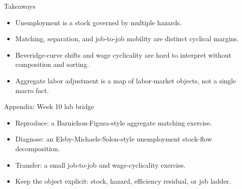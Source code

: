 \documentclass[aspectratio=169,11pt]{beamer}
\begin{document}
\begin{frame}{Takeaways}
\begin{itemize}
    \item Unemployment is a stock governed by multiple hazards.
    \item Matching, separation, and job-to-job mobility are distinct cyclical margins.
    \item Beveridge-curve shifts and wage cyclicality are hard to interpret without composition and sorting.
    \item Aggregate labor adjustment is a map of labor-market objects, not a single macro fact.
\end{itemize}
\end{frame}

\appendix

\begin{frame}{Appendix: Week 10 lab bridge}
\begin{itemize}
    \item Reproduce: a Barnichon-Figura-style aggregate matching exercise.
    \item Diagnose: an Elsby-Michaels-Solon-style unemployment stock-flow decomposition.
    \item Transfer: a small job-to-job and wage-cyclicality exercise.
    \item Keep the object explicit: stock, hazard, efficiency residual, or job ladder.
\end{itemize}
\end{frame}
\end{document}
